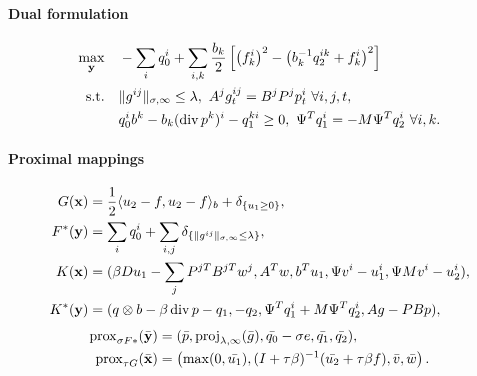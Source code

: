 \paragraph{Dual formulation}
\begin{align*}
    \max_{\mathbf{y}} \quad
        & -\sum_i q_0^i+ \sum_{i,k} \frac{b_k}{2} \left [
                \left(f_k^i\right)^2
                - \left(b_k^{-1} q_2^{ik} + f_k^i\right)^2
            \right ] \\
    \text{s.t.}\quad
        & \|g^{ij}\|_{\sigma,\infty} \leq \lambda,
          ~A^j g^{ij}_t = B^j P^j p^i_t ~\forall i,j,t, \\
        & q_0^i b^k - b_k (\operatorname{div} p^k)^i - q_1^{ki} \geq 0,
          ~\Psi^T q_1^i = -M \Psi^T q_2^i ~\forall i,k.
\end{align*}

\paragraph{Proximal mappings}
\begin{align*}
    G(\mathbf{x}) &= \frac{1}{2} \langle u_2-f, u_2-f \rangle_b
        + \delta_{\{u_1 \geq 0\}}, \\
    F^*(\mathbf{y}) &= \sum_{i} q_0^i
        + \sum_{i,j} \delta_{\{\|g^{ij}\|_{\sigma,\infty} \leq \lambda\}}, \\
    K(\mathbf{x}) &= (
        \beta Du_1 - \sum_j P^{jT}B^{jT}w^{j},
        A^T w,
        b^T u_1,
        \Psi v^i - u_1^i,
        \Psi M v^i - u_2^i
    ), \\
    K^*(\mathbf{y}) &= (
        q \otimes b - \beta \operatorname{div}{p} - q_1,
        -q_2,
        \Psi^T q_1^i + M \Psi^T q_2^i,
        A g - PBp
    ),
\end{align*}
\begin{align*}
    \operatorname{prox}_{\sigma F*}(\bar{\mathbf{y}})
    &= (
        \bar{p},
        \operatorname{proj}_{\lambda,\infty}(\bar{g}),
        \bar{q_0}-\sigma e,
        \bar{q_1},
        \bar{q_2}
    ), \\
    \operatorname{prox}_{\tau G}(\bar{\mathbf{x}})
    &= \left(
        \max(0,\bar{u_1}),
        (I+\tau \beta)^{-1}(\bar{u_2} + \tau \beta f),
        \bar{v},
        \bar{w}
    \right).
\end{align*}

